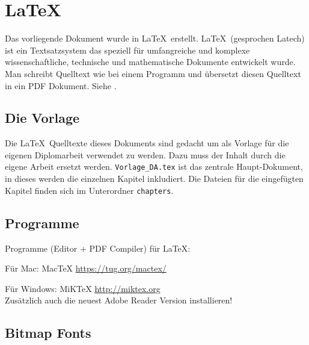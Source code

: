 


\chapter{\LaTeX}

Das vorliegende Dokument wurde in \LaTeX\ erstellt.
\LaTeX\ (gesprochen Latech) ist ein Textsatzsystem das speziell für umfangreiche  und komplexe wissenschaftliche, technische und mathematische Dokumente entwickelt wurde.
Man schreibt Quelltext wie bei einem Programm und übersetzt diesen Quelltext in ein PDF Dokument.
Siehe \cite{bib:latexintro}.


\section{Die Vorlage}

Die \LaTeX\ Quelltexte dieses Dokuments sind gedacht um als Vorlage für die eigenen Diplomarbeit verwendet zu werden.
Dazu muss der Inhalt durch die eigene Arbeit ersetzt werden.
\verb+Vorlage_DA.tex+ ist das zentrale Haupt-Dokument, in dieses werden die einzelnen Kapitel inkludiert. Die Dateien für die eingefügten Kapitel finden sich im Unterordner \verb+chapters+.


\section{Programme}

Programme (Editor + PDF Compiler) für \LaTeX:

Für Mac: MacTeX
\url{https://tug.org/mactex/}

Für Windows: MiKTeX
\url{http://miktex.org}\\
Zusätzlich auch die neuest Adobe Reader Version installieren!


\section{Bitmap Fonts}


